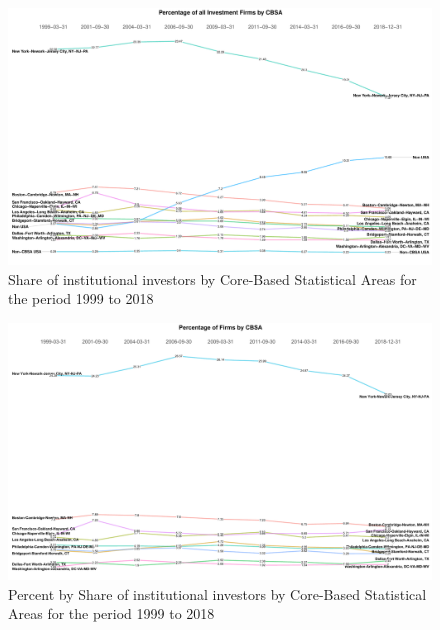 \begin{figure}[h]
	\centering
	\includegraphics[width=1\linewidth]{Figures/ChapterIII/Percentage_of_Investment_Firms_by_CBSA}
	\caption[Share of Institutional Investors by CBSA]{Share of institutional investors by Core-Based Statistical Areas for the period 1999 to 2018}
	\label{fig:percentageofinvestmentfirmsbycbsa}
\end{figure}



\begin{figure}
	\centering
	\includegraphics[width=1\linewidth]{Figures/ChapterIII/Percentage_of_Firms_by_CBSA}
	\caption[Percent by Share of Institutional Investors CBSA]{Percent by Share of institutional investors by Core-Based Statistical Areas for the period 1999 to 2018}
	\label{fig:percentageoffirmsbycbsa}
\end{figure}



